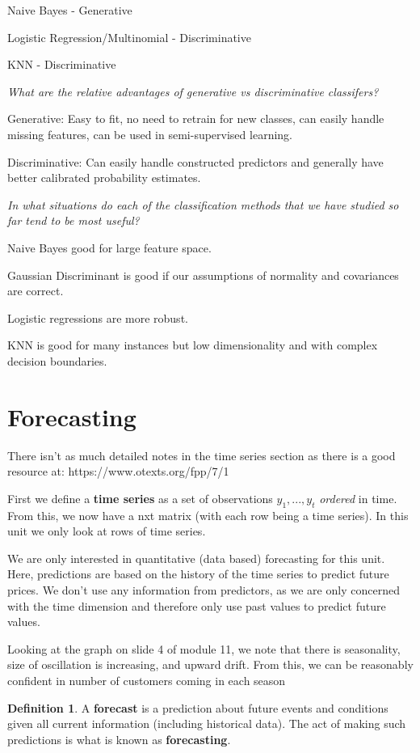 \documentclass[11pt, oneside]{article}
\theoremstyle{definition}
\newtheorem{definition}{Definition}[section]
\begin{document}
Naive Bayes - Generative

Logistic Regression/Multinomial - Discriminative

KNN - Discriminative

\textit{What are the relative advantages of generative vs discriminative classifers?}

Generative: Easy to fit, no need to retrain for new classes, can easily handle missing features, can be used in semi-supervised learning.

Discriminative: Can easily handle constructed predictors and generally have better calibrated probability estimates.

\textit{In what situations do each of the classification methods that we have studied so far tend to be most useful?}

Naive Bayes good for large feature space.

Gaussian Discriminant is good if our assumptions of normality and covariances are correct.

Logistic regressions are more robust.

KNN is good for many instances but low dimensionality and with complex decision boundaries.

\newpage
\section{Forecasting}
There isn't as much detailed notes in the time series section as there is a good resource at: https://www.otexts.org/fpp/7/1


First we define a \textbf{time series} as a set of observations $y_1,...,y_t$ \textit{ordered} in time. From this, we now have a nxt matrix (with each row being a time series). In this unit we only look at rows of time series.

 We are only interested in quantitative (data based) forecasting for this unit. Here, predictions are based on the history of the time series to predict future prices. We don’t use any information from predictors, as we are only concerned with the time dimension and therefore only use past values to predict future values.

Looking at the graph on slide 4 of module 11, we note that there is seasonality, size of oscillation is increasing, and upward drift. From this, we can be reasonably confident in number of customers coming in each season

\begin{definition}
A \textbf{forecast} is a prediction about future events and conditions given all current information (including historical data). The act of making such predictions is what is known as \textbf{forecasting}.
\end{definition}
\end{document}
